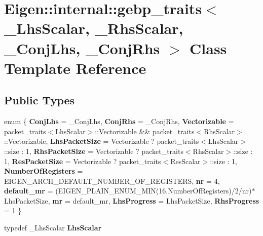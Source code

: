 \hypertarget{class_eigen_1_1internal_1_1gebp__traits}{}\section{Eigen\+::internal\+::gebp\+\_\+traits$<$ \+\_\+\+Lhs\+Scalar, \+\_\+\+Rhs\+Scalar, \+\_\+\+Conj\+Lhs, \+\_\+\+Conj\+Rhs $>$ Class Template Reference}
\label{class_eigen_1_1internal_1_1gebp__traits}
\subsection*{Public Types}
\begin{DoxyCompactItemize}
\item 
\mbox{\label{class_eigen_1_1internal_1_1gebp__traits_aa7d18d8e33200657433bb7977ac9b0cc}} 
enum \{ \newline
{\bfseries Conj\+Lhs} = \+\_\+\+Conj\+Lhs, 
{\bfseries Conj\+Rhs} = \+\_\+\+Conj\+Rhs, 
{\bfseries Vectorizable} = packet\+\_\+traits$<$Lhs\+Scalar$>$\+::Vectorizable \&\& packet\+\_\+traits$<$Rhs\+Scalar$>$\+::Vectorizable, 
{\bfseries Lhs\+Packet\+Size} = Vectorizable ? packet\+\_\+traits$<$Lhs\+Scalar$>$\+::size \+: 1, 
\newline
{\bfseries Rhs\+Packet\+Size} = Vectorizable ? packet\+\_\+traits$<$Rhs\+Scalar$>$\+::size \+: 1, 
{\bfseries Res\+Packet\+Size} = Vectorizable ? packet\+\_\+traits$<$Res\+Scalar$>$\+::size \+: 1, 
{\bfseries Number\+Of\+Registers} = E\+I\+G\+E\+N\+\_\+\+A\+R\+C\+H\+\_\+\+D\+E\+F\+A\+U\+L\+T\+\_\+\+N\+U\+M\+B\+E\+R\+\_\+\+O\+F\+\_\+\+R\+E\+G\+I\+S\+T\+E\+RS, 
{\bfseries nr} = 4, 
\newline
{\bfseries default\+\_\+mr} = (E\+I\+G\+E\+N\+\_\+\+P\+L\+A\+I\+N\+\_\+\+E\+N\+U\+M\+\_\+\+M\+IN(16,Number\+Of\+Registers)/2/nr)$\ast$\+Lhs\+Packet\+Size, 
{\bfseries mr} = default\+\_\+mr, 
{\bfseries Lhs\+Progress} = Lhs\+Packet\+Size, 
{\bfseries Rhs\+Progress} = 1
 \}
\item 
\mbox{\label{class_eigen_1_1internal_1_1gebp__traits_a2f117fb54968e17442eef419b254d26a}} 
typedef \+\_\+\+Lhs\+Scalar {\bfseries Lhs\+Scalar}
\item 
\mbox{\label{class_eigen_1_1internal_1_1gebp__traits_a8021575dd93cdaaaf840b07215e155e6}} 

\end{DoxyCompactItemize}
